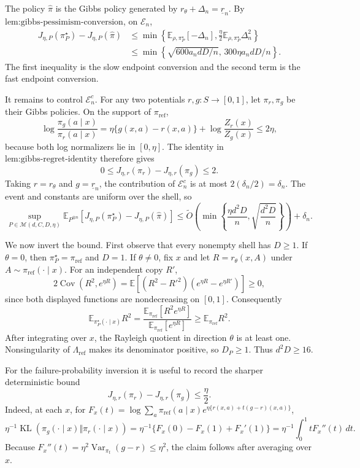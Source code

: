 The policy \(\widehat\pi\) is the Gibbs policy generated by \(r_\theta+\Delta_n=\underline r_n\). By \(\text{lem:gibbs-pessimism-conversion}\), on \(\mathcal E_n\),
\[
\begin{aligned}
J_{\eta,P}(\pi_P^\star)-J_{\eta,P}(\widehat\pi)
&\le\min\left\{\mathbb E_{\rho,\pi_P^\star}[-\Delta_n],
\frac\eta2\mathbb E_{\rho,\pi_P^\star}\Delta_n^2\right\}\\
&\le\min\left\{\sqrt{600a_ndD/n},\,300\eta a_ndD/n\right\}.
\end{aligned}
\]
The first inequality is the slow endpoint conversion and the second term is the fast endpoint conversion.

It remains to control \(\mathcal E_n^c\). For any two potentials \(r,g:S\to[0,1]\), let \(\pi_r,\pi_g\) be their Gibbs policies. On the support of \(\pi_{\mathrm{ref}}\),
\[
\log\frac{\pi_g(a\mid x)}{\pi_r(a\mid x)}
=\eta\{g(x,a)-r(x,a)\}+\log\frac{Z_r(x)}{Z_g(x)}\le2\eta,
\]
because both log normalizers lie in \([0,\eta]\). The identity in \(\text{lem:gibbs-regret-identity}\) therefore gives
\[
0\le J_{\eta,r}(\pi_r)-J_{\eta,r}(\pi_g)\le2.
\]
Taking \(r=r_\theta\) and \(g=\underline r_n\), the contribution of \(\mathcal E_n^c\) is at most \(2(\delta_n/2)=\delta_n\). The event and constants are uniform over the shell, so
\[
\sup_{P\in\mathcal M(d,C,D,\eta)}
\mathbb E_{P^{\otimes n}}[J_{\eta,P}(\pi_P^\star)-J_{\eta,P}(\widehat\pi)]
\le
\widetilde O\left(\min\left\{\frac{\eta d^2D}{n},\sqrt{\frac{d^2D}{n}}\right\}\right)+\delta_n.
\]

We now invert the bound. First observe that every nonempty shell has \(D\ge1\). If \(\theta=0\), then \(\pi_P^\star=\pi_{\mathrm{ref}}\) and \(D=1\). If \(\theta\ne0\), fix \(x\) and let \(R=r_\theta(x,A)\) under \(A\sim\pi_{\mathrm{ref}}(\cdot\mid x)\). For an independent copy \(R'\),
\[
2\operatorname{Cov}(R^2,e^{\eta R})
=\mathbb E[(R^2-R'^2)(e^{\eta R}-e^{\eta R'})]\ge0,
\]
since both displayed functions are nondecreasing on \([0,1]\). Consequently
\[
\mathbb E_{\pi_P^\star(\cdot\mid x)}R^2
=\frac{\mathbb E_{\pi_{\mathrm{ref}}}[R^2e^{\eta R}]}{\mathbb E_{\pi_{\mathrm{ref}}}[e^{\eta R}]}
\ge\mathbb E_{\pi_{\mathrm{ref}}}R^2.
\]
After integrating over \(x\), the Rayleigh quotient in direction \(\theta\) is at least one. Nonsingularity of \(\Lambda_{\mathrm{ref}}\) makes its denominator positive, so \(D_P\ge1\). Thus \(d^2D\ge16\).

For the failure-probability inversion it is useful to record the sharper deterministic bound
\[
J_{\eta,r}(\pi_r)-J_{\eta,r}(\pi_g)\le\frac\eta2.
\]
Indeed, at each \(x\), for \(F_x(t)=\log\sum_a\pi_{\mathrm{ref}}(a\mid x)e^{\eta\{r(x,a)+t(g-r)(x,a)\}}\),
\[
\eta^{-1}\operatorname{KL}(\pi_g(\cdot\mid x)\Vert\pi_r(\cdot\mid x))
=\eta^{-1}\{F_x(0)-F_x(1)+F_x'(1)\}
=\eta^{-1}\int_0^1tF_x''(t)\,dt.
\]
Because \(F_x''(t)=\eta^2\operatorname{Var}_{\pi_t}(g-r)\le\eta^2\), the claim follows after averaging over \(x\).

